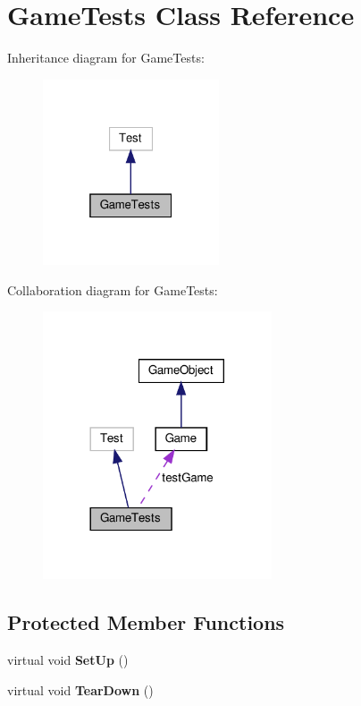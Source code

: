 \hypertarget{classGameTests}{}\section{Game\+Tests Class Reference}
\label{classGameTests}


Inheritance diagram for Game\+Tests\+:
\nopagebreak
\begin{figure}[H]
\begin{center}
\leavevmode
\includegraphics[width=148pt]{classGameTests__inherit__graph}
\end{center}
\end{figure}


Collaboration diagram for Game\+Tests\+:
\nopagebreak
\begin{figure}[H]
\begin{center}
\leavevmode
\includegraphics[width=192pt]{classGameTests__coll__graph}
\end{center}
\end{figure}
\subsection*{Protected Member Functions}
\begin{DoxyCompactItemize}
\item 
\mbox{\label{classGameTests_a26d16cb8feeac7e3093df07905e2585e}} 
virtual void {\bfseries Set\+Up} ()
\item 
\mbox{\label{classGameTests_a028fd3fe94c168d98c6b284d04613f0c}} 
virtual void {\bfseries Tear\+Down} ()
\end{DoxyCompactItemize}

